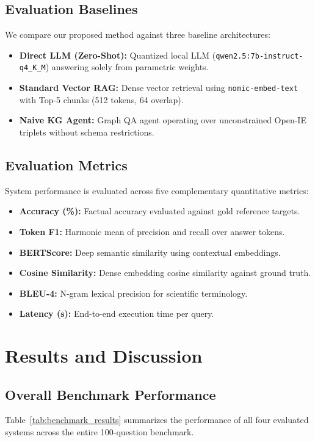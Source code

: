 \documentclass[conference]{IEEEtran}
\begin{document}
\subsection{Evaluation Baselines}
We compare our proposed method against three baseline architectures:
\begin{itemize}
    \item \textbf{Direct LLM (Zero-Shot):} Quantized local LLM (\texttt{qwen2.5:7b-instruct-q4\_K\_M}) answering solely from parametric weights.
    \item \textbf{Standard Vector RAG:} Dense vector retrieval using \texttt{nomic-embed-text} with Top-5 chunks (512 tokens, 64 overlap).
    \item \textbf{Naive KG Agent:} Graph QA agent operating over unconstrained Open-IE triplets without schema restrictions.
\end{itemize}

\subsection{Evaluation Metrics}
System performance is evaluated across five complementary quantitative metrics:
\begin{itemize}
    \item \textbf{Accuracy (\%):} Factual accuracy evaluated against gold reference targets.
    \item \textbf{Token F1:} Harmonic mean of precision and recall over answer tokens.
    \item \textbf{BERTScore:} Deep semantic similarity using contextual embeddings.
    \item \textbf{Cosine Similarity:} Dense embedding cosine similarity against ground truth.
    \item \textbf{BLEU-4:} N-gram lexical precision for scientific terminology.
    \item \textbf{Latency (s):} End-to-end execution time per query.
\end{itemize}

\section{Results and Discussion}
\label{sec:results}

\subsection{Overall Benchmark Performance}
Table~\ref{tab:benchmark_results} summarizes the performance of all four evaluated systems across the entire 100-question benchmark.
\end{document}
